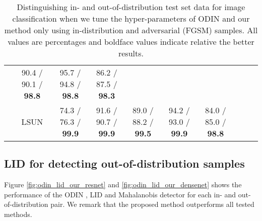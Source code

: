 \documentclass{article}
\begin{document}
\begin{table}[h]
{\begin{tabular}{@{}ccclclclll@{}}
& \multicolumn{1}{c}{90.4 / 90.1 / {\bf 98.8}}
& \multicolumn{1}{c}{95.7 / 94.8 / {\bf 98.8}}
& \multicolumn{1}{c}{86.2 / 87.5 / {\bf 98.3}}\\
& \multicolumn{1}{c}{LSUN} 
& \multicolumn{1}{c}{74.3 / 76.3 / {\bf 99.9}}
& \multicolumn{1}{c}{91.6 / 90.7 / {\bf 99.9}}
& \multicolumn{1}{c}{89.0 / 88.2 / {\bf 99.5}}
& \multicolumn{1}{c}{94.2 / 93.0 / {\bf 99.9}}
& \multicolumn{1}{c}{84.0 / 85.0 / {\bf 98.8}}\\ 
\bottomrule
\end{tabular}}
\vspace{+0.02in}
\caption{Distinguishing in- and out-of-distribution test set data for image classification when we tune the hyper-parameters of ODIN and our method only using in-distribution and adversarial (FGSM) samples. All values are percentages and boldface values indicate relative the better results.}
\label{tbl:out_val_out_candidate3}
\end{table}





\subsection{LID for detecting out-of-distribution samples} \label{appendix:LID_OOD}


Figure \ref{fig:odin_lid_our_resnet} and \ref{fig:odin_lid_our_densenet} shows the performance of the ODIN \citep{liang2017principled}, LID \citep{ma2018characterizing} and Mahalanobis detector for each in- and out-of-distribution pair. We remark that the proposed method outperforms all tested methods.
\end{document}
